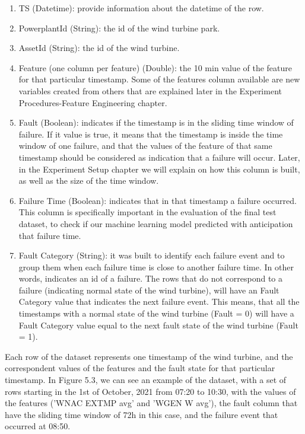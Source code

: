 \begin{enumerate}
    \item
TS (Datetime): provide information about the datetime of the row.
    \item
PowerplantId (String): the id of the wind turbine park.
    \item
AssetId (String): the id of the wind turbine.
    \item
Feature (one column per feature) (Double): the 10 min value of the feature for that particular timestamp. Some of the features column available are new variables created from others that are explained later in the Experiment Procedures-Feature Engineering chapter.
    \item
Fault (Boolean): indicates if the timestamp is in the sliding time window of failure. If it value is true, it means that the timestamp is inside the time window of one failure, and that the values of the feature of that same timestamp should be considered as indication that a failure will occur. Later, in the Experiment Setup chapter we will explain on how this column is built, as well as the size of the time window.
    \item
Failure Time (Boolean): indicates that in that timestamp a failure occurred. This column is specifically important in the evaluation of the final test dataset, to check if our machine learning model predicted with anticipation that failure time.
    \item
Fault Category (String): it was built to identify each failure event and to group them when each failure time is close to another failure time. In other words, indicates an id of a failure. The rows that do not correspond to a failure (indicating normal state of the wind turbine), will have an Fault Category value that indicates the next failure event. This means, that all the timestamps with a normal state of the wind turbine (Fault = 0) will have a Fault Category value equal to the next fault state of the wind turbine (Fault = 1).

\end{enumerate}

Each row of the dataset represents one timestamp of the wind turbine, and the correspondent values of the features and the fault state for that particular timestamp. In Figure 5.3, we can see an example of the dataset, with a set of rows starting in the 1st of October, 2021 from 07:20 to 10:30, with the values of the features ('WNAC EXTMP avg' and 'WGEN W avg'), the fault column that have the sliding time window of 72h in this case, and the failure event that occurred at 08:50.

